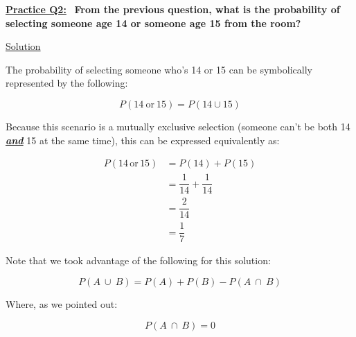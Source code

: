 \underline{\textbf{Practice Q2:}} \ \textbf{From the previous question, what is the probability of selecting someone
age 14 or someone age 15 from the room?}

\bigskip

\underline{Solution}

The probability of selecting someone who's 14 or 15 can be symbolically represented by the following:

\[
    P(14 \ \text{or} \ 15) = P(14 \cup 15)
\]

Because this scenario is a mutually exclusive selection (someone can't be both
14 \textit{\textbf{\underline{and}}} 15 at the same time), this can be expressed
equivalently as:

\begin{align*}
    P(14 \, \text{or} \, 15) &= P(14) + P(15) \\[1.5ex]
    &= \dfrac{1}{14} + \dfrac{1}{14} \\[1.5ex]
    &= \dfrac{2}{14} \\[1.5ex]
    &= \boxed{\dfrac{1}{7}}
\end{align*}

Note that we took advantage of the following for this solution:

\[
    P(A \ \cup \ B) = P(A) + P(B) - P(A \ \cap \ B)
\]


Where, as we pointed out:

\[
    P(A \ \cap \ B) = 0
\]